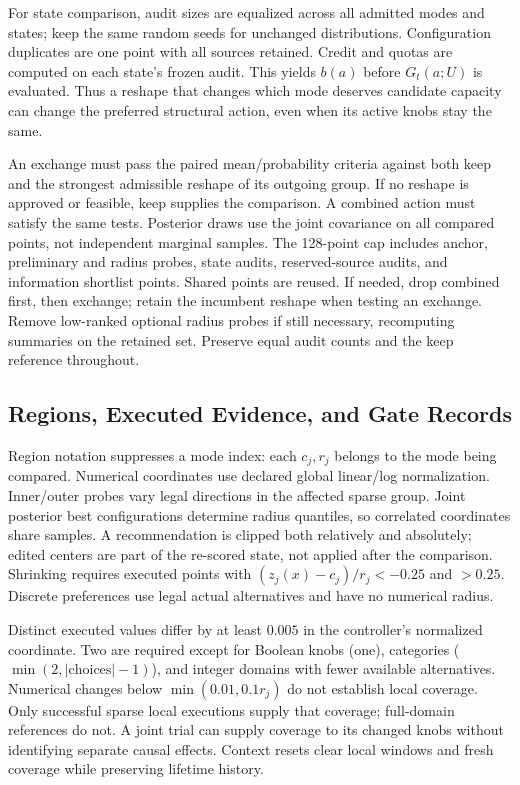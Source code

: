 For state comparison, audit sizes are equalized across all admitted modes
and states; keep the same random seeds for unchanged distributions.
Configuration duplicates are one point with all sources retained.
Credit and quotas are computed on each state's frozen audit. This yields
$b(a)$ before $G_t(a;U)$ is evaluated. Thus a reshape that changes which
mode deserves candidate capacity can change the preferred structural
action, even when its active knobs stay the same.

An exchange must pass the paired mean/probability criteria against both
keep and the strongest admissible reshape of its outgoing group. If no
reshape is approved or feasible, keep supplies the comparison. A combined
action must satisfy the same tests. Posterior draws use the joint
covariance on all compared points, not independent marginal samples.
The 128-point cap includes anchor, preliminary and radius probes, state audits,
reserved-source audits, and information shortlist points. Shared points
are reused. If needed, drop combined first, then exchange; retain the
incumbent reshape when testing an exchange. Remove low-ranked optional
radius probes if still necessary, recomputing summaries on the retained
set. Preserve equal audit counts and the keep reference throughout.

\subsection{Regions, Executed Evidence, and Gate Records}

Region notation suppresses a mode index: each $c_j,r_j$ belongs to the
mode being compared. Numerical coordinates use declared global linear/log
normalization. Inner/outer probes vary legal directions in the affected
sparse group. Joint posterior best configurations determine radius
quantiles, so correlated coordinates share samples. A recommendation is
clipped both relatively and absolutely; edited centers are part of the
re-scored state, not applied after the comparison. Shrinking requires
executed points with $(z_j(x)-c_j)/r_j<-0.25$ and $>0.25$. Discrete
preferences use legal actual alternatives and have no numerical radius.

Distinct executed values differ by at least $0.005$ in the controller's
normalized coordinate. Two are required except for Boolean knobs (one),
categories ($\min(2,|\mathrm{choices}|-1)$), and integer domains with fewer
available alternatives. Numerical changes below $\min(0.01,0.1r_j)$ do not
establish local coverage. Only successful sparse local executions supply
that coverage; full-domain references do not. A joint trial can supply
coverage to its changed knobs without identifying separate causal effects.
Context resets clear local windows and fresh coverage while preserving
lifetime history.

